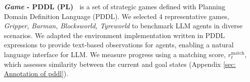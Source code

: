 \textbf{\textit{Game} - PDDL (PL)~\citep{vallati20152014}} is a set of strategic games defined with Planning Domain Definition Language (PDDL). 
We selected 4 representative games, \textit{Gripper, Barman, Blocksworld, Tyreworld} to benchmark LLM agents in diverse scenarios.
We adapted the environment implementation \citep{silver2020pddlgym} written in PDDL expressions to provide text-based observations for agents, enabling a natural language interface for LLM. We measure progress using a matching score, $r_t^{\text{match}}$, which assesses similarity between the current and goal states (Appendix \ref{sec: Annotation of pddl}).



